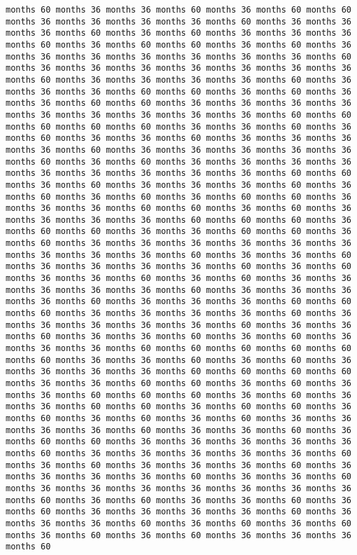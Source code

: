 \documentclass[11pt]{article}
\begin{document}
\begin{Verbatim}[commandchars=\\\{\}, frame=single, framerule=2mm, rulecolor=\color{outerrorbackground}]
months 60 months 36 months 36 months 60 months 36 months 60 months 60 months 36 months 36 months 36 months 36 months 60 months 36 months 36 months 36 months 60 months 36 months 60 months 36 months 36 months 36 months 60 months 36 months 60 months 60 months 36 months 60 months 36 months 36 months 36 months 36 months 36 months 36 months 36 months 60 months 36 months 36 months 36 months 36 months 36 months 36 months 36 months 60 months 36 months 36 months 36 months 36 months 60 months 36 months 36 months 36 months 60 months 60 months 36 months 60 months 36 months 36 months 60 months 60 months 36 months 36 months 36 months 36 months 36 months 36 months 36 months 36 months 36 months 60 months 60 months 60 months 60 months 60 months 36 months 36 months 60 months 36 months 60 months 36 months 36 months 60 months 36 months 36 months 36 months 36 months 60 months 36 months 36 months 36 months 36 months 36 months 60 months 36 months 60 months 36 months 36 months 36 months 36 months 36 months 36 months 36 months 36 months 36 months 60 months 60 months 36 months 60 months 36 months 36 months 36 months 60 months 36 months 60 months 36 months 60 months 36 months 60 months 60 months 36 months 36 months 36 months 60 months 60 months 36 months 60 months 36 months 36 months 36 months 36 months 60 months 60 months 60 months 36 months 60 months 60 months 36 months 36 months 60 months 60 months 36 months 60 months 36 months 36 months 36 months 36 months 36 months 36 months 36 months 36 months 36 months 60 months 36 months 36 months 60 months 36 months 36 months 36 months 36 months 60 months 36 months 60 months 36 months 36 months 60 months 36 months 60 months 36 months 36 months 36 months 36 months 36 months 60 months 36 months 36 months 36 months 36 months 60 months 36 months 36 months 36 months 60 months 60 months 60 months 36 months 36 months 36 months 36 months 60 months 36 months 36 months 36 months 36 months 36 months 60 months 36 months 36 months 60 months 36 months 36 months 60 months 36 months 60 months 36 months 36 months 36 months 60 months 60 months 60 months 60 months 60 months 60 months 36 months 36 months 60 months 36 months 60 months 36 months 36 months 36 months 36 months 60 months 60 months 60 months 60 months 36 months 36 months 60 months 60 months 36 months 60 months 36 months 36 months 60 months 60 months 60 months 36 months 60 months 36 months 36 months 60 months 60 months 36 months 60 months 60 months 36 months 60 months 36 months 60 months 36 months 60 months 36 months 36 months 36 months 36 months 60 months 36 months 36 months 60 months 36 months 60 months 60 months 36 months 36 months 36 months 36 months 36 months 60 months 36 months 36 months 36 months 36 months 36 months 60 months 36 months 60 months 36 months 36 months 36 months 60 months 36 months 36 months 36 months 36 months 60 months 36 months 36 months 60 months 36 months 36 months 36 months 36 months 36 months 36 months 36 months 60 months 36 months 60 months 36 months 36 months 60 months 36 months 60 months 36 months 36 months 36 months 36 months 60 months 36 months 36 months 36 months 60 months 36 months 60 months 36 months 60 months 36 months 60 months 36 months 60 months 36 months 36 months 36 months 60 
\end{Verbatim}
\end{document}
